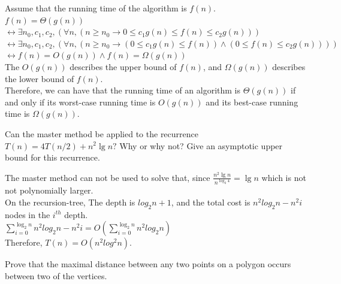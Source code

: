 \documentclass[a4paper, justified]{tufte-handout}
\begin{document}
\begin{solution}
  Assume that the running time of the algorithm is $f(n)$.\\
  $f(n)=\Theta(g(n))$\\
  $\leftrightarrow \exists n_0,c_1,c_2,(\forall n,(n\geq n_0\to 0\leq c_1g(n)\leq f(n)\leq c_2g(n)))$\\
  $\leftrightarrow \exists n_0,c_1,c_2,(\forall n,(n\geq n_0\to (0\leq c_1g(n)\leq f(n))\land(0\leq f(n) \leq c_2g(n))))$\\
  $\leftrightarrow f(n)=O(g(n))\land f(n)=\Omega(g(n))$\\
  The $O(g(n))$ describes the upper bound of $f(n)$, and $\Omega(g(n))$ describes the lower bound of $f(n)$.\\
  Therefore, we can have that  the running time of an algorithm is $\Theta(g(n))$ if and only if its worst-case running time is $O(g(n))$ and its best-case running time is $\Omega(g(n))$.
\end{solution}

\begin{problem}[2-4.4 TC 4.5-4]
Can the master method be applied to the recurrence $T(n)=4 T(n / 2)+n^{2} \lg n ?$ Why or why not? Give an asymptotic upper bound for this recurrence.
\end{problem}

\begin{solution}
  The master method can not be used to solve that, since $\frac{n^2\lg n}{n^{\log_2{4}}}=\lg n$ which is not not polynomially larger.\\
  On the  recursion-tree, The depth is  $log_2{n}+1$, and the total cost is  $n^2log_2n-n^2i$ nodes in the $i^{th}$ depth.\\
  $\sum\limits_{i=0}^{\log_2n}n^2log_2n-n^2i=O(\sum\limits_{i=0}^{\log_2n}n^2log_2n)$\\
  Therefore, $T(n)=O(n^2log^2n)$.
\end{solution}

\begin{problem}[2-6.1 DH 4-8]
Prove that the maximal distance between any two points on a polygon occurs between two of the vertices.
\end{problem}
\end{document}
